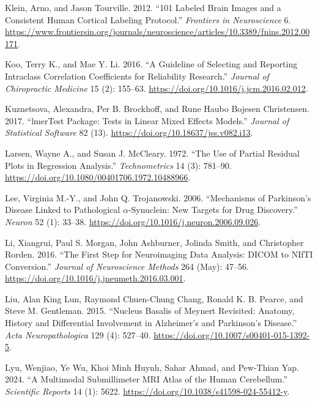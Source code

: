 \documentclass[
  table]{article}
\newlength{\cslhangindent}
\newenvironment{CSLReferences}[2] %
 {\begin{list}{}{%
  \setlength{\itemindent}{0pt}
  \setlength{\leftmargin}{0pt}
  \setlength{\parsep}{0pt}
  \ifodd #1
   \setlength{\leftmargin}{\cslhangindent}
   \setlength{\itemindent}{-1\cslhangindent}
  \fi
  \setlength{\itemsep}{#2\baselineskip}}}
 {\end{list}}
\begin{document}
\begin{CSLReferences}{1}{0}
Klein, Arno, and Jason Tourville. 2012. {``101 {Labeled} {Brain}
{Images} and a {Consistent} {Human} {Cortical} {Labeling} {Protocol}.''}
\emph{Frontiers in Neuroscience} 6.
\url{https://www.frontiersin.org/journals/neuroscience/articles/10.3389/fnins.2012.00171}.

Koo, Terry K., and Mae Y. Li. 2016. {``A {Guideline} of {Selecting} and
{Reporting} {Intraclass} {Correlation} {Coefficients} for {Reliability}
{Research}.''} \emph{Journal of Chiropractic Medicine} 15 (2): 155--63.
\url{https://doi.org/10.1016/j.jcm.2016.02.012}.

Kuznetsova, Alexandra, Per B. Brockhoff, and Rune Haubo Bojesen
Christensen. 2017. {``{lmerTest} {Package}: {Tests} in {Linear} {Mixed}
{Effects} {Models}.''} \emph{Journal of Statistical Software} 82 (13).
\url{https://doi.org/10.18637/jss.v082.i13}.

Larsen, Wayne A., and Susan J. McCleary. 1972. {``The {Use} of {Partial}
{Residual} {Plots} in {Regression} {Analysis}.''} \emph{Technometrics}
14 (3): 781--90. \url{https://doi.org/10.1080/00401706.1972.10488966}.

Lee, Virginia M.-Y., and John Q. Trojanowski. 2006. {``Mechanisms of
{Parkinson}'s {Disease} {Linked} to {Pathological}
\(\alpha\)-{Synuclein}: {New} {Targets} for {Drug} {Discovery}.''}
\emph{Neuron} 52 (1): 33--38.
\url{https://doi.org/10.1016/j.neuron.2006.09.026}.

Li, Xiangrui, Paul S. Morgan, John Ashburner, Jolinda Smith, and
Christopher Rorden. 2016. {``The First Step for Neuroimaging Data
Analysis: {DICOM} to {NIfTI} Conversion.''} \emph{Journal of
Neuroscience Methods} 264 (May): 47--56.
\url{https://doi.org/10.1016/j.jneumeth.2016.03.001}.

Liu, Alan King Lun, Raymond Chuen-Chung Chang, Ronald K. B. Pearce, and
Steve M. Gentleman. 2015. {``Nucleus Basalis of {Meynert} Revisited:
Anatomy, History and Differential Involvement in {Alzheimer}{'}s and
{Parkinson}{'}s Disease.''} \emph{Acta Neuropathologica} 129 (4):
527--40. \url{https://doi.org/10.1007/s00401-015-1392-5}.

Lyu, Wenjiao, Ye Wu, Khoi Minh Huynh, Sahar Ahmad, and Pew-Thian Yap.
2024. {``A Multimodal Submillimeter {MRI} Atlas of the Human
Cerebellum.''} \emph{Scientific Reports} 14 (1): 5622.
\url{https://doi.org/10.1038/s41598-024-55412-y}.


\end{CSLReferences}
\end{document}
